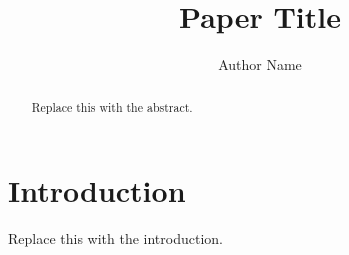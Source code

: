 \documentclass[manuscript,review,anonymous]{acmart}
\begin{document}
\title{Paper Title}

\author{Author Name}

\begin{abstract}
Replace this with the abstract.
\end{abstract}

\maketitle

\section{Introduction}
Replace this with the introduction.

% 
% 
\end{document}
